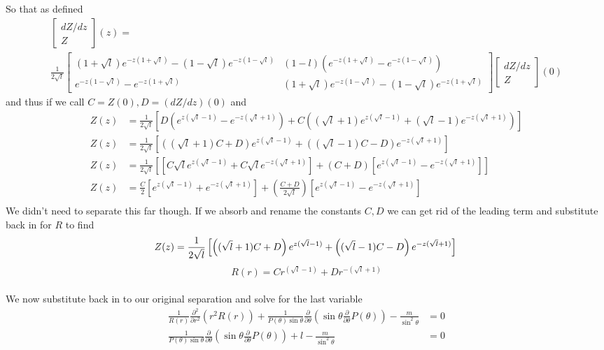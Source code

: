\documentclass{article}	%
\theoremstyle{definition}
\begin{document}
So that as defined
\begin{multline*}
\begin{bmatrix}
dZ/dz\\
Z
\end{bmatrix}
(z)
= \\
\frac{1}{2\sqrt{l}}
\begin{bmatrix}
(1+\sqrt{l})e^{-z(1+\sqrt{l})} -(1-\sqrt{l})e^{-z(1-\sqrt{l})}	&	(1-l)\left( e^{-z(1+\sqrt{l})} -e^{-z(1-\sqrt{l})} \right)	\\
e^{-z(1-\sqrt{l})} -e^{-z(1+\sqrt{l})}							&	(1+\sqrt{l})e^{-z(1-\sqrt{l})} -(1-\sqrt{l})e^{-z(1+\sqrt{l})}
\end{bmatrix}
\begin{bmatrix}
dZ/dz\\
Z
\end{bmatrix}
(0) 
\end{multline*}
and thus if we call $C=Z(0),D=(dZ/dz)(0)$ and 
\begin{align*}
Z(z) &= \frac{1}{2\sqrt{l}}\left[D\left(e^{z(\sqrt{l}-1)} -e^{-z(\sqrt{l}+1)}\right) +C\left((\sqrt{l}+1)e^{z(\sqrt{l}-1)} +(\sqrt{l}-1)e^{-z(\sqrt{l}+1)}\right)\right]\\
Z(z) &= \frac{1}{2\sqrt{l}}\left[\left((\sqrt{l}+1)C+D \right)e^{z(\sqrt{l}-1)} +\left((\sqrt{l}-1)C-D \right)e^{-z(\sqrt{l}+1)} \right]\\
Z(z) &= \frac{1}{2\sqrt{l}}\left[ \left[ C\sqrt{l}e^{z(\sqrt{l}-1)} +C\sqrt{l}e^{-z(\sqrt{l}+1)}\right] +(C+D)\left[e^{z(\sqrt{l}-1)} -e^{-z(\sqrt{l}+1)}\right] \right]\\
Z(z) &= \frac{C}{2}\left[ e^{z(\sqrt{l}-1)} +e^{-z(\sqrt{l}+1)}\right] +\left(\frac{C+D}{2\sqrt{l}}\right)\left[e^{z(\sqrt{l}-1)} -e^{-z(\sqrt{l}+1)}\right] \\
\end{align*}
We didn't need to separate this far though. If we absorb and rename the constants $C,D$ we can get rid of the leading term and substitute back in for $R$ to find
\[ Z(z) = \frac{1}{2\sqrt{l}}\left[\left((\sqrt{l}+1)C+D \right)e^{z(\sqrt{l}-1)} +\left((\sqrt{l}-1)C-D \right)e^{-z(\sqrt{l}+1)} \right]\\ \]
\[ R(r) = Cr^{(\sqrt{l}-1)} +Dr^{-(\sqrt{l}+1)} \]

\paragraph{}
We now substitute back in to our original separation and solve for the last variable
\begin{align*}
\frac{1}{R(r)} \frac{\partial^{2}}{\partial r^{2}}(r^{2}R(r)) +\frac{1}{P(\theta)\sin\theta} \frac{\partial}{\partial\theta}\left( \sin\theta \frac{\partial}{\partial\theta}P(\theta) \right) -\frac{m}{\sin^{2}\theta} &= 0\\
\frac{1}{P(\theta)\sin\theta} \frac{\partial}{\partial\theta}\left( \sin\theta \frac{\partial}{\partial\theta}P(\theta) \right) +l -\frac{m}{\sin^{2}\theta} &= 0\\
\end{align*}
\end{document}

